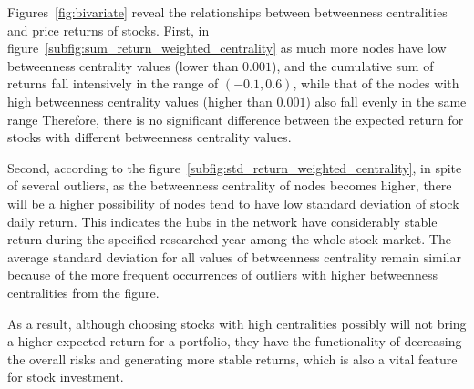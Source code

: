 Figures~\ref{fig:bivariate} reveal the relationships between betweenness centralities and price returns of stocks. First, in figure~\ref{subfig:sum_return_weighted_centrality} as much more nodes have low betweenness centrality values (lower than $0.001$), and the cumulative sum of returns fall intensively in the range of $(-0.1, 0.6)$, while that of the nodes with high betweenness centrality values (higher than $0.001$) also fall evenly in the same range Therefore, there is no significant difference between the expected return for stocks with different betweenness centrality values.

Second, according to the figure~\ref{subfig:std_return_weighted_centrality}, in spite of several outliers, as the betweenness centrality of nodes becomes higher, there will be a higher possibility of nodes tend to have low standard deviation of stock daily return. This indicates the hubs in the network have considerably stable return during the specified researched year among the whole stock market. The average standard deviation for all values of betweenness centrality remain similar because of the more frequent occurrences of outliers with higher betweenness centralities from the figure.

As a result, although choosing stocks with high centralities possibly will not bring a higher expected return for a portfolio, they have the functionality of decreasing the overall risks and generating more stable returns, which is also a vital feature for stock investment.





